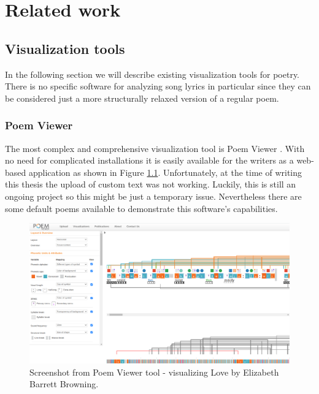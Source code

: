\chapter{Related work}


\section{Visualization tools}
In the following section we will describe existing visualization tools for poetry. There is no specific software for analyzing song lyrics in particular since they can be considered just a more structurally relaxed version of a regular poem.
\subsection{Poem Viewer}
The most complex and comprehensive visualization tool is Poem Viewer \cite{Abdul2013}. With no need for complicated installations it is easily available for the writers as a web-based application as shown in Figure \ref{screenshotPV}. Unfortunately, at the time of writing this thesis the upload of custom text was not working. Luckily, this is still an ongoing project so this might be just a temporary issue. Nevertheless there are some default poems available to demonstrate this software's capabilities.
\begin{figure}[h]\centering
	\includegraphics[scale=0.24]{../img/ScreenshotPV.png}
	\caption{Screenshot from Poem Viewer tool - visualizing Love by Elizabeth Barrett Browning.}\label{screenshotPV}
\end{figure}

